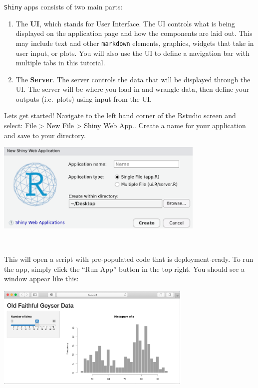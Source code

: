 \documentclass[]{book}
\begin{document}
\texttt{Shiny} apps consists of two main parts:

\begin{enumerate}
\def\labelenumi{\arabic{enumi})}
\item
  The \textbf{UI}, which stands for User Interface. The UI controls what is being displayed on the application page and how the components are laid out. This may include text and other \texttt{markdown} elements, graphics, widgets that take in user input, or plots. You will also use the UI to define a navigation bar with multiple tabs in this tutorial.
\item
  The \textbf{Server}. The server controls the data that will be displayed through the UI. The server will be where you load in and wrangle data, then define your outputs (i.e.~plots) using input from the UI.
\end{enumerate}

Lets get started! Navigate to the left hand corner of the Rstudio screen and select: File \textgreater{} New File \textgreater{} Shiny Web App.. Create a name for your application and save to your directory.

\includegraphics[width=0.75\textwidth,height=\textheight]{img/new_shiny_app.png}

~

This will open a script with pre-populated code that is deployment-ready. To run the app, simply click the ``Run App'' button in the top right. You should see a window appear like this:

\includegraphics[width=0.7\textwidth,height=\textheight]{./img/shiny01.png}
\end{document}
